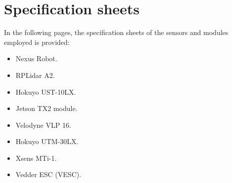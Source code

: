 
\chapter{Specification sheets}

In the following pages, the specification sheets of the sensors and modules employed is provided:
\begin{itemize}
  \item Nexus Robot.
  \item RPLidar A2.
  \item Hokuyo UST-10LX.
  \item Jetson TX2 module.
  \item Velodyne VLP 16.
  \item Hokuyo UTM-30LX.
  \item Xsens MTi-1.
  \item Vedder ESC (VESC).
\end{itemize}















